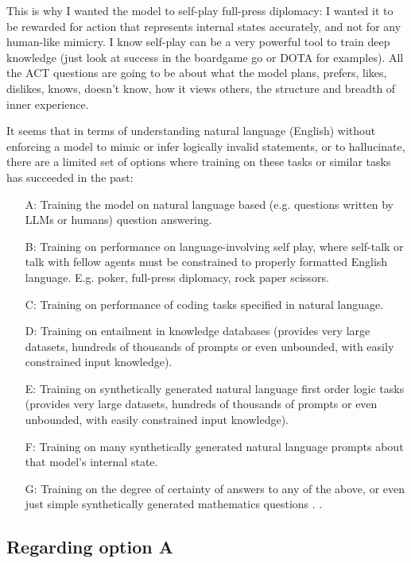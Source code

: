 \documentclass{article}
\begin{document}
This is why I wanted the model to self-play full-press diplomacy: I wanted it to be rewarded for action that represents internal states accurately, and not for any human-like mimicry. I know self-play can be a very powerful tool to train deep knowledge (just look at success in the boardgame go or DOTA for examples). All the ACT questions are going to be about what the model plans, prefers, likes, dislikes, knows, doesn't know, how it views others, the structure and breadth of inner experience.

It seems that in terms of understanding natural language (English) without enforcing a model to mimic or infer logically invalid statements, or to hallucinate, there are a limited set of options where training on these tasks or similar tasks has succeeded in the past:
\begin{itemize}
    \item[A:] Training the model on natural language based (e.g. questions written by LLMs or humans) question answering.
    \item[B:] Training on performance on language-involving self play, where self-talk or talk with fellow agents must be constrained to properly formatted English language. E.g. poker, full-press diplomacy, rock paper scissors.
    \item[C:] Training on performance of coding tasks specified in natural language.
    \item[D:] Training on entailment in knowledge databases (provides very large datasets, hundreds of thousands of prompts or even unbounded, with easily constrained input knowledge).
    \item[E:] Training on synthetically generated natural language first order logic tasks (provides very large datasets, hundreds of thousands of prompts or even unbounded, with easily constrained input knowledge).
    \item[F:] Training on many synthetically generated natural language prompts about that model's internal state.
    \item[G:] Training on the degree of certainty of answers to any of the above, or even just simple synthetically generated mathematics questions \citep{lin2022teachingmodelsexpressuncertainty}.
.
\end{itemize}

\subsection{Regarding option A}
\end{document}
